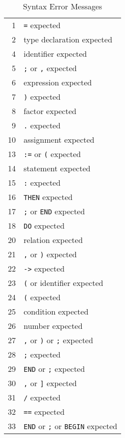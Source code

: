 \begin{table}
\begin{center}
\begin{tabular}{rl}
           1  & \verb/=/ expected \\ 
           2  & type declaration expected \\ 
           4  & identifier expected \\ 
           5  & \verb/;/ or \verb/,/ expected \\ 
           6  & expression expected \\ 
           7  & \verb/)/ expected \\ 
           8  & factor expected \\ 
           9  & \verb/./ expected \\ 
          10  & assignment expected \\ 
          13  & \verb/:=/ or \verb/(/ expected \\ 
          14  & statement expected \\ 
          15  & \verb/:/ expected \\ 
          16  & \verb/THEN/ expected \\ 
          17  & \verb/;/ or \verb/END/ expected \\ 
          18  & \verb/DO/ expected \\ 
          20  & relation expected \\ 
          21  & \verb/,/ or \verb/)/ expected \\
          22  & \verb/->/ expected \\
          23  & \verb/(/ or identifier expected \\ 
          24  & \verb/(/ expected \\ 
          25  & condition expected \\ 
          26  & number expected \\ 
          27  & \verb/,/ or \verb/)/ or \verb/;/ expected \\ 
          28  & \verb/;/ expected \\ 
          29  & \verb/END/ or \verb/;/ expected \\ 
          30  & \verb/,/ or \verb/]/ expected \\ 
          31  & \verb./. expected \\ 
          32  & \verb/==/ expected \\ 
          33  & \verb/END/ or \verb/;/ or \verb/BEGIN/ expected  
\end{tabular}
\end{center}
\label{tabSE}
\caption{Syntax Error Messages}
\end{table}

